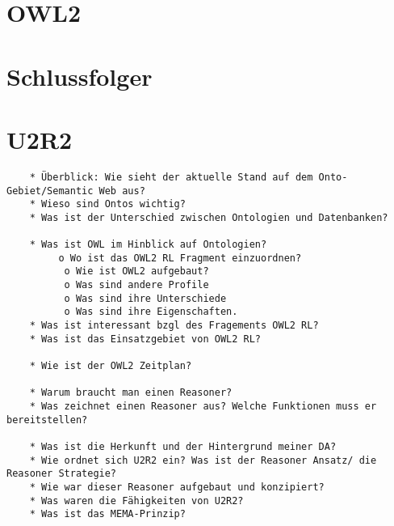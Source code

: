 \section{OWL2}

\section{Schlussfolger}

\section{U2R2}

\begin{verbatim}
    * Überblick: Wie sieht der aktuelle Stand auf dem Onto-Gebiet/Semantic Web aus?
    * Wieso sind Ontos wichtig?
    * Was ist der Unterschied zwischen Ontologien und Datenbanken? 
    
    * Was ist OWL im Hinblick auf Ontologien?
         o Wo ist das OWL2 RL Fragment einzuordnen?
          o Wie ist OWL2 aufgebaut?
          o Was sind andere Profile
          o Was sind ihre Unterschiede
          o Was sind ihre Eigenschaften.
    * Was ist interessant bzgl des Fragements OWL2 RL?
    * Was ist das Einsatzgebiet von OWL2 RL?
    
    * Wie ist der OWL2 Zeitplan?
    
    * Warum braucht man einen Reasoner?
    * Was zeichnet einen Reasoner aus? Welche Funktionen muss er bereitstellen?
    
    * Was ist die Herkunft und der Hintergrund meiner DA?
    * Wie ordnet sich U2R2 ein? Was ist der Reasoner Ansatz/ die Reasoner Strategie?
    * Wie war dieser Reasoner aufgebaut und konzipiert?
    * Was waren die Fähigkeiten von U2R2?
    * Was ist das MEMA-Prinzip?
    
    
\end{verbatim}

